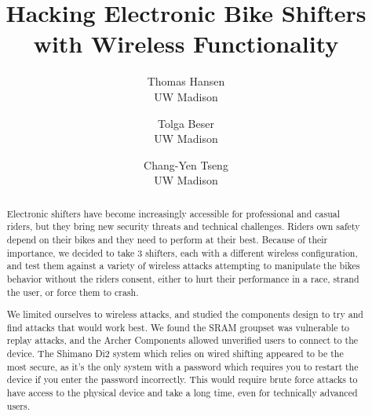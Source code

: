 \documentclass[letterpaper,twocolumn,10pt]{article}
\begin{document}
\date{}

\title{\Large \bf Hacking Electronic Bike Shifters with Wireless Functionality }

\author{
  {\rm Thomas Hansen}\\
  UW Madison
  \and
  {\rm Tolga Beser}\\
  UW Madison
  \and
  {\rm Chang-Yen Tseng}\\
  UW Madison
} %

\maketitle

\thispagestyle{empty}


\begin{abstract}
  Electronic shifters have become increasingly accessible for professional and casual riders, but they bring new security threats and technical challenges. Riders own safety depend on their bikes and they need to perform at their best. Because of their importance, we decided to take 3 shifters, each with a different wireless configuration, and test them against a variety of wireless attacks attempting to manipulate the bikes behavior without the riders consent, either to hurt their performance in a race, strand the user, or force them to crash.

  We limited ourselves to wireless attacks, and studied the components design to try and find attacks that would work best. We found the SRAM groupset was vulnerable to replay attacks, and the Archer Components allowed unverified users to connect to the device. The Shimano Di2 system which relies on wired shifting appeared to be the most secure, as it's the only system with a password which requires you to restart the device if you enter the password incorrectly. This would require brute force attacks to have access to the physical device and take a long time, even for technically advanced users.
\end{abstract}
\end{document}
